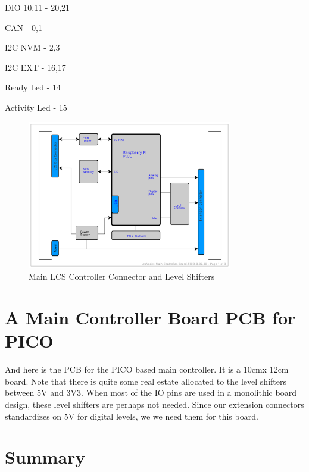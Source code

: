 DIO 10,11       - 20,21

CAN             - 0,1

I2C NVM         - 2,3

I2C EXT         - 16,17

Ready Led       - 14

Activity Led    - 15



\begin{figure}[htbp]
    \centering
    \includegraphics[page=3, width=0.8\textwidth]{./Schematics/Schematic_LcsNodes-Main-Controller-Board.pdf}
    \caption{Main LCS Controller Connector and Level Shifters}
\end{figure}
\FloatBarrier

\section{A Main Controller Board PCB for PICO}

And here is the PCB for the PICO based main controller. It is a 10cmx 12cm board. Note that there is quite some real estate allocated to the level shifters between 5V and 3V3. When most of the IO pins are used in a monolithic board design, these level shifters are perhaps not needed. Since our extension connectors standardizes on 5V for digital levels, we we need them for this board.

\FloatBarrier

\section{Summary}

